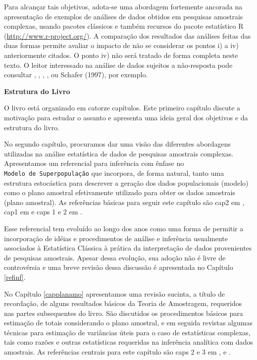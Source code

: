 \documentclass[]{book}
\theoremstyle{definition}
\theoremstyle{definition}
\theoremstyle{definition}
\theoremstyle{remark}
\begin{document}
Para alcançar tais objetivos, adota-se uma abordagem fortemente ancorada
na apresentação de exemplos de análises de dados obtidos em pesquisas
amostrais complexas, usando pacotes clássicos e também recursos do
pacote estatístico R (\url{http://www.r-project.org/}). A comparação dos
resultados das análises feitas das duas formas permite avaliar o impacto
de não se considerar os pontos i) a iv) anteriormente citados. O ponto
iv) não será tratado de forma completa neste texto. O leitor interessado
na análise de dados sujeitos a não-resposta pode consultar
\citep{kalton83a}, \citep{LR2002}, \citep{Rubin87}, \citep{SSW92}, ou
Schafer (1997), por exemplo.

\textbf{Estrutura do Livro}

O livro está organizado em catorze capítulos. Este primeiro capítulo
discute a motivação para estudar o assunto e apresenta uma ideia geral
dos objetivos e da estrutura do livro.

No segundo capítulo, procuramos dar uma visão das diferentes abordagens
utilizadas na análise estatística de dados de pesquisas amostrais
complexas. Apresentamos um referencial para inferência com ênfase no
\texttt{Modelo\ de\ Superpopulação} que incorpora, de forma natural,
tanto uma estrutura estocástica para descrever a geração dos dados
populacionais (modelo) como o plano amostral efetivamente utilizado para
obter os dados amostrais (plano amostral). As referências básicas para
seguir este capítulo são cap2 em \citep{Silva}, cap1 em \citep{SHS89} e
caps 1 e 2 em \citep{CHSK2003}.

Esse referencial tem evoluído ao longo dos anos como uma forma de
permitir a incorporação de idéias e procedimentos de análise e
inferência usualmente associados à Estatística Clássica à prática da
interpretação de dados provenientes de pesquisas amostrais. Apesar dessa
evolução, sua adoção não é livre de controvérsia e uma breve revisão
dessa discussão é apresentada no Capítulo \ref{refinf}.

No Capítulo \ref{capplanamo} apresentamos uma revisão sucinta, a título
de recordação, de alguns resultados básicos da Teoria de Amostragem,
requeridos nas partes subsequentes do livro. São discutidos os
procedimentos básicos para estimação de totais considerando o plano
amostral, e em seguida revistas algumas técnicas para estimação de
variâncias úteis para o caso de estatísticas complexas, tais como razões
e outras estatísticas requeridas na inferência analítica com dados
amostrais. As referências centrais para este capítulo são caps 2 e 3 em
\citep{SSW92}, \citep{W85} e \citep{cochran}.
\end{document}
